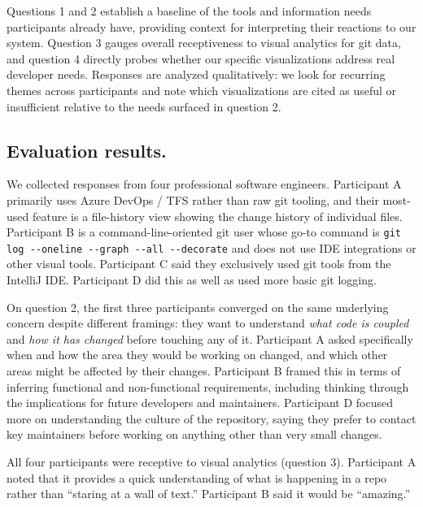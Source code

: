 \documentclass[12 pt]{article}
\begin{document}
Questions 1 and 2 establish a baseline of the tools and information needs
participants already have, providing context for interpreting their reactions
to our system.  Question 3 gauges overall receptiveness to visual analytics
for git data, and question 4 directly probes whether our specific
visualizations address real developer needs.  Responses are analyzed
qualitatively: we look for recurring themes across participants and note
which visualizations are cited as useful or insufficient relative to the
needs surfaced in question 2.


\subsection{Evaluation results.}
We collected responses from four professional software engineers.
Participant A primarily uses Azure DevOps / TFS rather than raw git tooling,
and their most-used feature is a file-history view showing the change history
of individual files.
Participant B is a command-line-oriented git user whose go-to command is
\texttt{git log -{}-oneline -{}-graph -{}-all -{}-decorate} and does not use
IDE integrations or other visual tools. Participant C said they exclusively
used git tools from the IntelliJ IDE. Participant D did this as well as used more basic git
logging.

On question 2, the first three participants converged on the same underlying concern
despite different framings: they want to understand \emph{what code is
coupled} and \emph{how it has changed} before touching any of it.
Participant A asked specifically when and how the area they would be working
on changed, and which other areas might be affected by their changes.
Participant B framed this in terms of inferring functional and non-functional
requirements, including thinking through the implications for future
developers and maintainers. Participant D focused more on understanding the
culture of the repository, saying they prefer to contact key maintainers before
working on anything other than very small changes.

All four participants were receptive to visual analytics (question 3).
Participant A noted that it provides a quick understanding of what is
happening in a repo rather than ``staring at a wall of text.''
Participant B said it would be ``amazing.''
\end{document}
